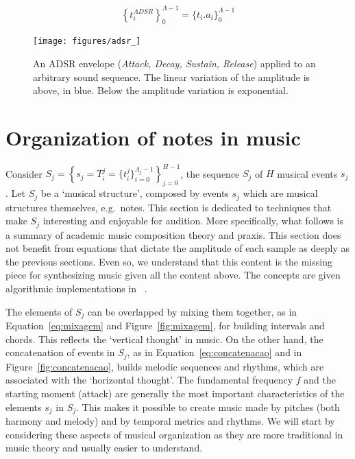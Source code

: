\begin{equation}\label{eq:adsrApl}
\left\{t_i^{ADSR}\right\}_0^{\Lambda-1} =\{t_i . a_i\}_0^{\Lambda-1}
\end{equation}

\begin{figure}[htp!]
    \centering
        \texttt{[image: figures/adsr\_]}
    \caption{An ADSR envelope (\emph{Attack, Decay, Sustain, Release}) applied to an arbitrary sound sequence. The linear variation of the amplitude is above, in blue. Below the amplitude variation is exponential.}
        \label{fig:adsr}
\end{figure}





\section{Organization of notes in music}\label{notasMusica} \label{sec:notesMusic}
Consider $S_j=\left\{  s_j=T_i^j=\{t_i^j\}_{i=0}^{\Lambda_j-1} \right\}_{j=0}^{H-1}$, the sequence $S_j$ of $H$ musical events $s_j$. Let $S_j$ be a `musical structure', composed by events $s_j$ which are musical structures themselves, e.g.\ notes. This section is dedicated to techniques that make $S_j$ interesting and enjoyable for audition. More specifically, what follows is a summary of academic music composition theory and praxis.
This section does not benefit from equations that dictate the amplitude of each sample as deeply as the previous sections.
Even so, we understand that this content is the missing piece for synthesizing music given all the content above.
The concepts are given algorithmic implementations in \mass~\cite{SI}.

The elements of $S_j$ can be overlapped by mixing them together, as in
Equation~\ref{eq:mixagem} and Figure~\ref{fig:mixagem}, for building intervals and chords. This reflects the `vertical thought' in music. On the other hand, the concatenation of events
in $S_j$, as in Equation~\ref{eq:concatenacao} and in Figure~\ref{fig:concatenacao}, builds melodic sequences and rhythms, which are associated with the `horizontal thought'. The fundamental frequency $f$ and the starting moment
(attack) are generally the most important characteristics of the elements $s_j$ in $S_j$. This makes it possible to create music made by pitches (both harmony and melody) and by temporal metrics and rhythms.
We will start by considering these aspects of musical organization as they are more traditional in music theory and usually easier to understand.

